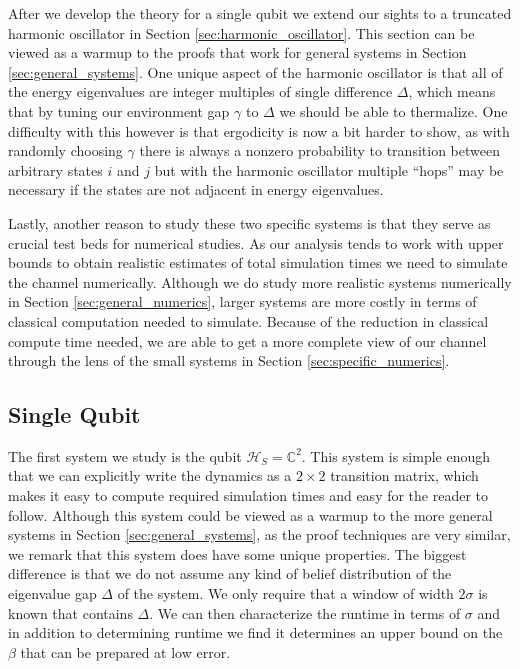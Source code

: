 \documentclass[
 amsmath,amssymb,
 aps,
onecolumn, 
nofootinbib]{revtex4-2}
\newcommand{\hilb}{\mathcal{H}}
\begin{document}
After we develop the theory for a single qubit we extend our sights to a truncated harmonic oscillator in Section \ref{sec:harmonic_oscillator}. This section can be viewed as a warmup to the proofs that work for general systems in Section \ref{sec:general_systems}. One unique aspect of the harmonic oscillator is that all of the energy eigenvalues are integer multiples of single difference $\Delta$, which means that by tuning our environment gap $\gamma$ to $\Delta$ we should be able to thermalize. One difficulty with this however is that ergodicity is now a bit harder to show, as with randomly choosing $\gamma$ there is always a nonzero probability to transition between arbitrary states $i$ and $j$ but with the harmonic oscillator multiple ``hops'' may be necessary if the states are not adjacent in energy eigenvalues.

Lastly, another reason to study these two specific systems is that they serve as crucial test beds for numerical studies. As our analysis tends to work with upper bounds to obtain realistic estimates of total simulation times we need to simulate the channel numerically. Although we do study more realistic systems numerically in Section \ref{sec:general_numerics}, larger systems are more costly in terms of classical computation needed to simulate. Because of the reduction in classical compute time needed, we are able to get a more complete view of our channel through the lens of the small systems in Section \ref{sec:specific_numerics}.

\subsection{Single Qubit} \label{sec:single_qubit}
The first system we study is the qubit $\hilb_S = \mathbb{C}^2$. This system is simple enough that we can explicitly write the dynamics as a $2 \times 2$ transition matrix, which makes it easy to compute required simulation times and easy for the reader to follow. Although this system could be viewed as a warmup to the more general systems in Section \ref{sec:general_systems}, as the proof techniques are very similar, we remark that this system does have some unique properties. The biggest difference is that we do not assume any kind of belief distribution of the eigenvalue gap $\Delta$ of the system. We only require that a window of width $2 \sigma$ is known that contains $\Delta$. We can then characterize the runtime in terms of $\sigma$ and in addition to determining runtime we find it determines an upper bound on the $\beta$ that can be prepared at low error.
\end{document}
